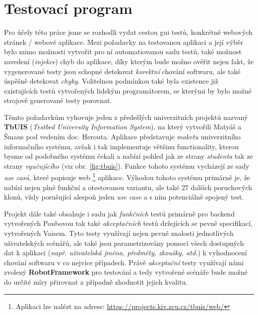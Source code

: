 \documentclass[czech, ma, kiv, he, iso690numb, pdf, viewonly]{fasthesis}
\begin{document}
    \section{Testovací program} \label{sec:test_program}

    Pro účely této práce jsme se rozhodli vydat cestou \acrshort{gui} testů, konkrétně webových stránek / webové aplikace. Mezi požadavky na testovanou aplikaci a její výběr bylo mimo možnosti vytvořit pro ní automatiovanou sadu testů, také možnost zavedení (\emph{injekce}) chyb do aplikace, díky kterým bude možno ověřit nejen fakt, že vygenerované testy jsou schopné detekovat \textit{korektní} chování softwaru, ale také úspěšně detekovat \textit{chyby}. Volitelnou podmínkou také byla existence již existujících testů vytvořených lidským programátorem, se kterými by bylo možné strojově generované testy porovnat.
    
    Těmto požadavkům vyhovuje jeden z předešlých univerzitních projektů nazvaný \textbf{TbUIS} (\textit{Testbed University Information System}), na který vytvořili Matyáš a Šmaus pod vedením doc. Herouta. \cite{Matyas2018} \cite{Smaus2019} Aplikace představuje \textit{maketu} univerzitního informačního systému, avšak i tak implementuje většinu functionality, kterou bysme od podobného systému čekali a nabízí pohled jak ze strany \textit{studenta} tak ze strany \textit{vyučujícího} (viz obr. \ref{fig:tbuis}). Funkce tohoto systému vycházejí ze sady \textit{use casů}, které popisuje web \footnote{Aplikaci lze nalézt na adrese: \url{https://projects.kiv.zcu.cz/tbuis/web/}} aplikace. Výhodou tohoto systému primárně je, že nabízí nejen plně funkční a otestovanou variantu, ale také \(27\) dalších poruchových klonů, vždy porušující alespoň jeden \textit{use case} a s ním potenciálně spojený test.

    Projekt dále také obsahuje i sadu jak \textit{funkčních} testů primárně pro backend vytvořených Poubovou tak také \textit{akceptačních} testů držejících se pevně specifikací, vytvořených Vaisem. \cite{Poubova2019} \cite{Vais2020} Tyto testy využívají nejen pevné znalosti jednotlivých uživatelských scénářů, ale také jsou parametrizovány pomocí všech dostupných dat k aplikaci (\textit{např. uživatelská jména, předměty, zkoušky, atd.}) k vyhodnocení chování softwaru v co nejvíce případech. Právě \textit{akceptační} testy využívají námi zvolený \textbf{RobotFramework} pro testování a tedy vytvořené scénáře bude možné do určité míry přirovnat a případně zhodnotit jejich kvalitu. 
\end{document}
